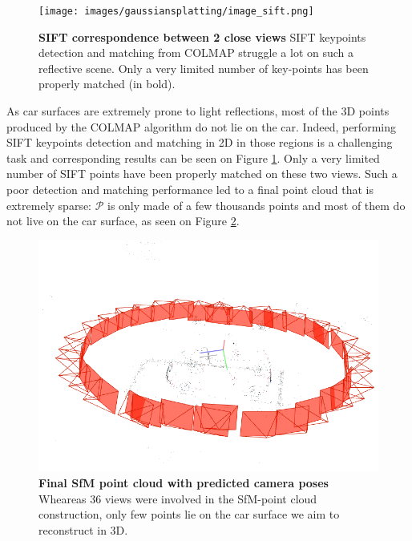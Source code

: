 \begin{figure}[htbp!]
    \center
  \texttt{[image: images/gaussiansplatting/image\_sift.png]}
  \caption{\textbf{SIFT correspondence between 2 close views} SIFT keypoints detection and matching from COLMAP struggle a lot on such a reflective scene. Only a very limited number of key-points has been properly matched (in bold).}
  \label{fig:sift-colmap}
\end{figure}

As car surfaces are extremely prone to light reflections, most of the 3D points produced by the COLMAP algorithm do not lie on the car. Indeed, performing SIFT keypoints detection and matching in 2D in those regions is a challenging task and corresponding results can be seen on Figure \ref{fig:sift-colmap}. Only a very limited number of SIFT points have been properly matched on these two views. Such a poor detection and matching performance led to a 
final point cloud that is extremely sparse: $\mathcal{P}$ is only made of a few thousands points and most of them do not live on the car surface, as seen on Figure \ref{fig:sfm-colmap-pc}. 

\begin{figure}[htbp!]
    \center
  \includegraphics[width=.8\linewidth]{images/gaussiansplatting/colmap_sparsePC.png}
  \caption{\textbf{Final SfM point cloud with predicted camera poses} Wheareas 36 views were involved in the \ac{SfM}-point cloud construction, only few points lie on the car surface we aim to reconstruct in 3D.}
  \label{fig:sfm-colmap-pc}
\end{figure}


